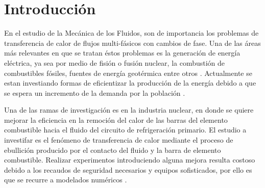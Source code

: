 \chapter{Introducción}
\graphicspath{{figs/cap1/}}
\label{cap1}



En el estudio de la Mecánica de los Fluidos, son de importancia los problemas de transferencia de calor de flujos multi-fásicos con cambios de fase. Una de las áreas más relevantes en que se tratan éstos problemas es la generación de energía eléctrica, ya sea por medio de fisión o fusión nuclear, la combustión de combustibles fósiles, fuentes de energía geotérmica entre otros \cite{incropera2007fundamentals}. Actualmente se estan investiando formas de eficientizar la producción de la energía debido a que se espera un incremento de la demanda por la población \cite{schiffer2018world}.

Una de las ramas de investigación es en la industria nuclear, en donde se quiere mejorar la eficiencia en la remoción del calor de las barras del elemento combustible hacia el fluido del circuito de refrigeración primario. El estudio a investifar es el fenómeno de transferencia de calor mediante el proceso de ebullición producido por el contacto del fluido y la barra de elemento combustible. Realizar experimentos introduciendo alguna mejora resulta costoso debido a los recaudos de seguridad necesarios y equipos sofisticados,  por ello es que se recurre a modelados numéricos \cite{zhang2011numerical}. 




